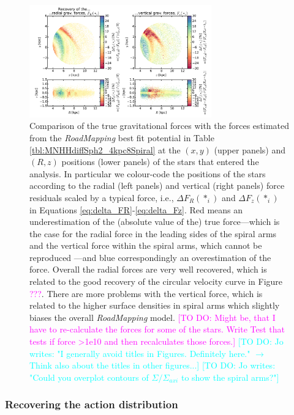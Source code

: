 \documentclass[iop,revtex4,numberedappendix,appendixfloats]{emulateapj}
\newcommand{\RM}{{\sl RoadMapping}}
\newcommand{\Wilma}[1]{\textcolor{Magenta}{#1}}
\newcommand{\Jo}[1]{\textcolor{Cyan}{#1}}
\begin{document}
\begin{figure}[!htbp]
\centering
\includegraphics[width=0.7\textwidth]{fig/MNdHHdiffSph2_4kpc8Spiral_a_test1_forces_overview_6.pdf}
\caption{Comparison of the true gravitational forces with the forces estimated from the \RM{} best fit potential in Table \ref{tbl:MNHHdiffSph2_4kpc8Spiral} at the $(x,y)$ (upper panels) and $(R,z)$ positions (lower panels) of the stars that entered the analysis. In particular we colour-code the positions of the stars according to the radial (left panels) and vertical (right panels) force residuals scaled by a typical force, i.e., $\Delta F_R(*_i)$ and $\Delta F_z(*_i)$ in Equations \eqref{eq:delta_FR}-\eqref{eq:delta_Fz}. Red means an underestimation of the (absolute value of the)  true force---which is the case for the radial force in the leading sides of the spiral arms and the vertical force within the spiral arms, which cannot be reproduced ---and blue correspondingly an overestimation of the force. Overall the radial forces are very well recovered, which is related to the good recovery of the circular velocity curve in Figure \Wilma{???}. There are more problems with the vertical force, which is related to the higher surface densities in spiral arms which slightly biases the overall \RM{} model. \Wilma{[TO DO: Might be, that I have to re-calculate the forces for some of the stars. Write Test that tests if force >1e10 and then recalculates those forces.]} \Jo{[TO DO: Jo writes: "I generally avoid titles in Figures. Definitely here." $\longrightarrow$ Think also about the titles in other figures...]} \Jo{[TO DO: Jo writes: "Could you overplot contours of $\Sigma/\Sigma_{axi}$ to show the spiral arms?"]}}
\label{fig:4kpc8Spiral_forces}
\end{figure}


\subsubsection{Recovering the action distribution}
\end{document}
